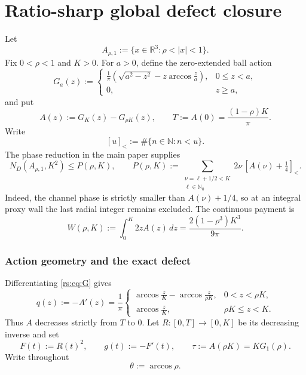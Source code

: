 \documentclass[11pt]{article}
\theoremstyle{remark}
\begin{document}
\renewcommand{\thesection}{\Roman{section}}
\tableofcontents
\clearpage

\section{Ratio-sharp global defect closure}
\label{part:ratio}


Let
\[
 A_{\rho,1}:=\{x\in\mathbb R^3:\rho<|x|<1\}.
\]
Fix $0<\rho<1$ and $K>0$.  For $a>0$, define the zero-extended ball
action
\begin{equation}
 G_a(z):=
 \begin{cases}
 \displaystyle \frac1\pi\left(\sqrt{a^2-z^2}
      -z\arccos\frac za\right),&0\leq z<a,\\[4pt]
 0,&z\geq a,
 \end{cases}
 \label{rs:eq:G}
\end{equation}
and put
\begin{equation}
 A(z):=G_K(z)-G_{\rho K}(z),
 \qquad
 T:=A(0)=\frac{(1-\rho)K}{\pi}.
 \label{rs:eq:A-T}
\end{equation}
Write
\[
 [u]_<:=\#\{n\in\mathbb N:n<u\}.
\]
The phase reduction in the main paper supplies
\begin{equation}
 N_D(A_{\rho,1},K^2)\leq P(\rho,K),
 \qquad
 P(\rho,K):=
 \sum_{\substack{\nu=\ell+1/2<K\\ \ell\in\mathbb N_0}}
 2\nu\,[A(\nu)+\tfrac14]_<.
 \label{rs:eq:phase-proxy}
\end{equation}
Indeed, the channel phase is strictly smaller than $A(\nu)+1/4$, so at an
integral proxy wall the last radial integer remains excluded.  The
continuous payment is
\begin{equation}
 W(\rho,K):=\int_0^K2zA(z)\,dz
 =\frac{2(1-\rho^3)K^3}{9\pi}.
 \label{rs:eq:W}
\end{equation}

\subsubsection*{Action geometry and the exact defect}

Differentiating \eqref{rs:eq:G} gives
\begin{equation}
 q(z):=-A'(z)=\frac1\pi
 \begin{cases}
 \displaystyle
 \arccos\frac zK-\arccos\frac z{\rho K},&0<z<\rho K,\\[6pt]
 \displaystyle \arccos\frac zK,&\rho K\leq z<K.
 \end{cases}
 \label{rs:eq:q}
\end{equation}
Thus $A$ decreases strictly from $T$ to $0$.  Let
$R:[0,T]\to[0,K]$ be its decreasing inverse and set
\begin{equation}
 F(t):=R(t)^2,
 \qquad g(t):=-F'(t),
 \qquad \tau:=A(\rho K)=KG_1(\rho).
 \label{rs:eq:inverse-data}
\end{equation}
Write throughout
\[
 \theta:=\arccos\rho.
\]
\end{document}
